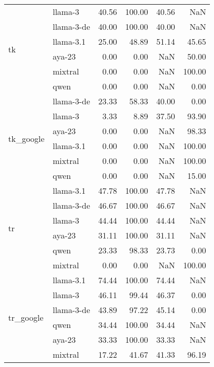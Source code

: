 \begin{tabular}{llrrrr}
\cline{1-6}
\multirow[t]{6}{*}{tk} & llama-3 & 40.56 & 100.00 & 40.56 & NaN \\
 & llama-3-de & 40.00 & 100.00 & 40.00 & NaN \\
 & llama-3.1 & 25.00 & 48.89 & 51.14 & 45.65 \\
 & aya-23 & 0.00 & 0.00 & NaN & 50.00 \\
 & mixtral & 0.00 & 0.00 & NaN & 100.00 \\
 & qwen & 0.00 & 0.00 & NaN & 0.00 \\
\cline{1-6}
\multirow[t]{6}{*}{tk_google} & llama-3-de & 23.33 & 58.33 & 40.00 & 0.00 \\
 & llama-3 & 3.33 & 8.89 & 37.50 & 93.90 \\
 & aya-23 & 0.00 & 0.00 & NaN & 98.33 \\
 & llama-3.1 & 0.00 & 0.00 & NaN & 100.00 \\
 & mixtral & 0.00 & 0.00 & NaN & 100.00 \\
 & qwen & 0.00 & 0.00 & NaN & 15.00 \\
\cline{1-6}
\multirow[t]{6}{*}{tr} & llama-3.1 & 47.78 & 100.00 & 47.78 & NaN \\
 & llama-3-de & 46.67 & 100.00 & 46.67 & NaN \\
 & llama-3 & 44.44 & 100.00 & 44.44 & NaN \\
 & aya-23 & 31.11 & 100.00 & 31.11 & NaN \\
 & qwen & 23.33 & 98.33 & 23.73 & 0.00 \\
 & mixtral & 0.00 & 0.00 & NaN & 100.00 \\
\cline{1-6}
\multirow[t]{6}{*}{tr_google} & llama-3.1 & 74.44 & 100.00 & 74.44 & NaN \\
 & llama-3 & 46.11 & 99.44 & 46.37 & 0.00 \\
 & llama-3-de & 43.89 & 97.22 & 45.14 & 0.00 \\
 & qwen & 34.44 & 100.00 & 34.44 & NaN \\
 & aya-23 & 33.33 & 100.00 & 33.33 & NaN \\
 & mixtral & 17.22 & 41.67 & 41.33 & 96.19 \\
\cline{1-6}
\bottomrule
\end{tabular}
